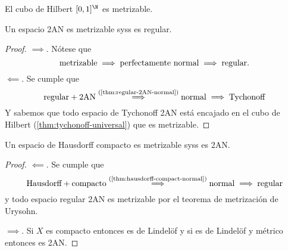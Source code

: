 \documentclass[topologia-analisis.tex]{subfiles}
\begin{document}
\begin{cor}
	El cubo de Hilbert $[0,1]^{\N}$ es metrizable.
\end{cor}

\begin{thmi}
	Un espacio 2AN es metrizable syss es regular.
\end{thmi}
\begin{proof}
	$\implies$. Nótese que
	$$ \rm metrizable \implies \text{perfectamente normal} \implies regular. $$
	$\impliedby$. Se cumple que
	$$ \rm regular + 2AN \overset{ \text{(\ref{thm:regular-2AN-normal})} }{ \implies } normal \implies Tychonoff $$
	Y sabemos que todo espacio de Tychonoff 2AN está encajado en el cubo de Hilbert (\ref{thm:tychonoff-universal}) que es metrizable.
\end{proof}

\begin{thm}
	Un espacio de Hausdorff compacto es metrizable syss es 2AN.
\end{thm}
\begin{proof}
	$\impliedby$. Se cumple que
	$$ \rm Hausdorff + compacto \overset{ \text{(\ref{thm:hausdorff-compact-normal})} }{ \implies } normal \implies regular $$
	y todo espacio regular 2AN es metrizable por el teorema de metrización de Urysohn.
	\par
	$\implies$. Si $X$ es compacto entonces es de Lindelöf y si es de Lindelöf y métrico entonces es 2AN.
\end{proof}
\thmdep{}
\end{document}
